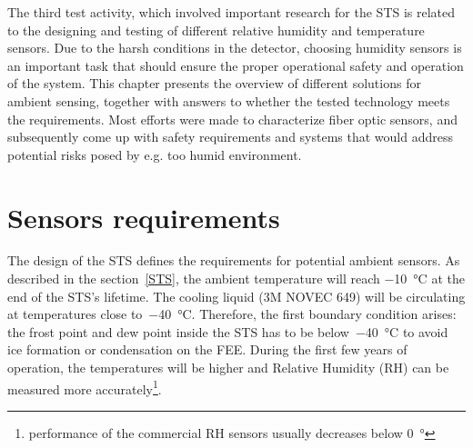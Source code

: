 The third test activity, which involved important research for the \gls{STS} is related to the designing and testing of different relative humidity and temperature sensors. Due to the harsh conditions in the detector, choosing humidity sensors is an important task that should ensure the proper operational safety and operation of the system. This chapter presents the overview of different solutions for ambient sensing, together with answers to whether the tested technology meets the requirements. Most efforts were made to characterize fiber optic sensors, and subsequently come up with safety requirements and systems that would address potential risks posed by e.g. too humid environment. 

\section{Sensors requirements}

The design of the \gls{STS} \cite{Heuser:54798} defines the requirements for potential ambient sensors. As described in the section~\ref{STS}, the ambient temperature will reach \SI{-10}{\celsius} at the end of the \gls{STS}'s lifetime. The cooling liquid (3M NOVEC 649) will be circulating at temperatures close to~\SI{-40}{\celsius}. Therefore, the first boundary condition arises: the frost point and dew point inside the \gls{STS} has to be below~\SI{-40}{\celsius} to avoid ice formation or condensation on the \gls{FEE}.
During the first few years of operation, the temperatures will be higher and Relative Humidity (\gls{RH}) can be measured more accurately\footnote{performance of the commercial RH sensors usually decreases below \SI{0}{\degree}}. 

